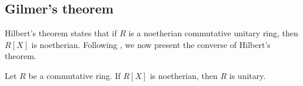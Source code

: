 \section{}



\subsection{Gilmer's theorem}

Hilbert's theorem states that 
if $R$ is a noetherian 
commutative unitary ring, then
$R[X]$ is noetherian. Following \cite{MR212007}, 
we now present the converse of Hilbert's theorem. 

\begin{theorem}[Gilmer]
    Let $R$ be a commutative ring. If $R[X]$ is noetherian, 
    then $R$ is unitary. 
\end{theorem}

